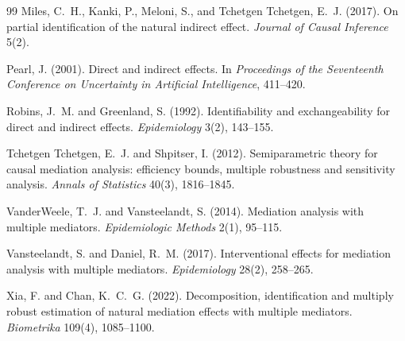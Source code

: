 \documentclass[11pt]{article}
\theoremstyle{definition}
\theoremstyle{plain}
\theoremstyle{remark}
\begin{document}
\begin{thebibliography}{99}
Miles, C.~H., Kanki, P., Meloni, S., and Tchetgen Tchetgen, E.~J. (2017).
\newblock On partial identification of the natural indirect effect.
\newblock \emph{Journal of Causal Inference} 5(2).

Pearl, J. (2001).
\newblock Direct and indirect effects.
\newblock In \emph{Proceedings of the Seventeenth Conference on Uncertainty in
Artificial Intelligence}, 411--420.

Robins, J.~M. and Greenland, S. (1992).
\newblock Identifiability and exchangeability for direct and indirect effects.
\newblock \emph{Epidemiology} 3(2), 143--155.

Tchetgen Tchetgen, E.~J. and Shpitser, I. (2012).
\newblock Semiparametric theory for causal mediation analysis: efficiency
bounds, multiple robustness and sensitivity analysis.
\newblock \emph{Annals of Statistics} 40(3), 1816--1845.

VanderWeele, T.~J. and Vansteelandt, S. (2014).
\newblock Mediation analysis with multiple mediators.
\newblock \emph{Epidemiologic Methods} 2(1), 95--115.

Vansteelandt, S. and Daniel, R.~M. (2017).
\newblock Interventional effects for mediation analysis with multiple
mediators.
\newblock \emph{Epidemiology} 28(2), 258--265.

Xia, F. and Chan, K.~C.~G. (2022).
\newblock Decomposition, identification and multiply robust estimation of
natural mediation effects with multiple mediators.
\newblock \emph{Biometrika} 109(4), 1085--1100.

\end{thebibliography}
\end{document}
